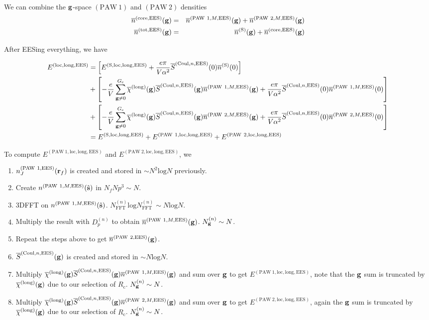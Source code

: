\documentclass[paper=a4, fontsize=11pt]{article} %
\numberwithin{equation}{section} %
\numberwithin{figure}{section} %
\numberwithin{table}{section} %
\newcommand{\ol}{\overline}
\newcommand{\bs}{{\bf{s}}}
\newcommand{\bg}{{\bf{g}}}
\newcommand{\br}{{\bf{r}}}
\newcommand{\rS}{{\mathrm{S}}}
\newcommand{\rEES}{{\mathrm{EES}}}
\newcommand{\rcore}{{\mathrm{core}}}
\newcommand{\rCo}{{\mathrm{Coul}}}
\newcommand{\rlong}{{\mathrm{long}}}
\newcommand{\rP}{{\mathrm{PAW}}}
\newcommand{\rlo}{{\mathrm{loc}}}
\newcommand{\rl}{{\mathrm{log}}}
\newcommand{\rtot}{{\mathrm{tot}}}
\newcommand{\NFFTn}{{N^{(n)}_{\mathrm{FFT}}}}
\newcommand{\Ngn}{{N^{(n)}_\bg}}
\newcommand{\Rc}{{R_{\mathrm{c}}}}
\newcommand{\Gc}{{G_{\mathrm{c}}}}
\begin{document}
We can combine the $\bg$-space $(\rP\ 1)$ and $(\rP\ 2)$ densities
\begin{eqnarray}
\ol n^{(\rcore,\rEES)}(\bg) &=& \ol n^{(\rP\ 1,M,\rEES)}(\bg)+\ol n^{(\rP\ 2,M,\rEES)}(\bg)\\
\ol n^{(\rtot,\rEES)}(\bg) &=& \ol n^{(\rS)}(\bg)+\ol n^{(\rcore,\rEES)}(\bg)
\end{eqnarray}



After EESing everything, we have

\begin{equation}
\begin{split}
E^{(\rlo,\rlong,\rEES)}
& = \left[E^{(\rS,\rlo,\rlong,\rEES)} + \frac{e\pi}{V \alpha^2} \ol S^{(\rCo,n,\rEES)}(0) \ol n^{(\rS)}(0)\right] \\
&+ \left[-\frac{e}{V} \sum_{\bg \neq 0}^{\Gc} \ol \chi^{(\rlong)}(\bg)  \ol S^{(\rCo,n,\rEES)}(\bg) \ol n^{(\rP\ 1,M,\rEES)}(\bg) + \frac{e\pi}{V \alpha^2} \ol S^{(\rCo,n,\rEES)}(0) \ol n^{(\rP\ 1,M,\rEES)}(0)\right]\\
&+ \left[-\frac{e}{V} \sum_{\bg \neq 0}^{\Gc} \ol \chi^{(\rlong)}(\bg)  \ol S^{(\rCo,n,\rEES)}(\bg) \ol n^{(\rP\ 2,M,\rEES)}(\bg) + \frac{e\pi}{V \alpha^2} \ol S^{(\rCo,n,\rEES)}(0) \ol n^{(\rP\ 2,M,\rEES)}(0)\right]\\
&= E^{(\rS,\rlo,\rlong,\rEES)} + E^{(\rP\ 1,\rlo,\rlong,\rEES)}  + E^{(\rP\ 2,\rlo,\rlong,\rEES)}
\end{split}
\end{equation}


To compute $E^{(\rP\ 1,\rlo,\rlong,\rEES)}$ and $E^{(\rP\ 2,\rlo,\rlong,\rEES)} $, we
\begin{enumerate}
\item $n_J^{(\rP\ 1,\rEES)}(\br_f)$ is created and stored in $\sim N^2 \rl N$ previously.
\item Create $n^{(\rP\ 1,M,\rEES)}(\hat \bs)$ in $N_fNp^3 \sim N$.
\item 3DFFT on $n^{(\rP\ 1,M,\rEES)}(\hat \bs)$. $\NFFTn \rl \NFFTn \sim N \rl N$.
\item Multiply the result with $D_p^{(n)}$ to obtain $\ol n^{(\rP\ 1,M,\rEES)}(\bg)$. $\Ngn \sim N$.
\item Repeat the steps above to get $\ol n^{(\rP\ 2,\rEES)}(\bg)$.
\item $\ol S^{(\rCo,n,\rEES)}(\bg)$ is created and stored in $\sim N \rl N$.
\item Multiply $\ol \chi^{(\rlong)}(\bg)  \ol S^{(\rCo,n,\rEES)}(\bg) \ol n^{(\rP\ 1,M,\rEES)}(\bg)$ and sum over $\bg$ to get $E^{(\rP\ 1,\rlo,\rlong,\rEES)}$, note that the $\bg$ sum is truncated by $\ol \chi^{(\rlong)}(\bg)$ due to our selection of $\Rc$. $\Ngn \sim N$.
\item Multiply $\ol \chi^{(\rlong)}(\bg)  \ol S^{(\rCo,n,\rEES)}(\bg) \ol n^{(\rP\ 2,M,\rEES)}(\bg)$ and sum over $\bg$ to get $E^{(\rP\ 2,\rlo,\rlong,\rEES)}$, again the $\bg$ sum is truncated by $\ol \chi^{(\rlong)}(\bg)$ due to our selection of $\Rc$. $\Ngn \sim N$.
\end{enumerate}
\end{document}
